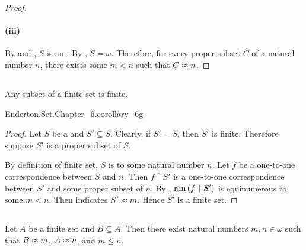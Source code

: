 \documentclass{report}
\begin{document}
\begin{proof}
    \paragraph{(iii)}%

      By  and , $S$ is an
        .
      By , $S = \omega$.
      Therefore, for every proper subset $C$ of a natural number $n$, there
        exists some $m < n$ such that $C \approx n$.

  \end{proof}

\subsection{}%

  \begin{corollary}[6G]
    Any subset of a finite set is finite.
  \end{corollary}

    {Enderton.Set.Chapter\_6.corollary\_6g}

  \begin{proof}
    Let $S$ be a  and $S' \subseteq S$.
    Clearly, if $S' = S$, then $S'$ is finite.
    Therefore suppose $S'$ is a proper subset of $S$.

    By definition of finite set, $S$ is  to some
      natural number $n$.
    Let $f$ be a one-to-one correspondence between $S$ and $n$.
    Then $f \restriction S'$ is a one-to-one correspondence between $S'$ and
      some proper subset of $n$.
    By , $\mathop{\text{ran}}{(f \restriction S')}$ is equinumerous to
      some $m < n$.
    Then  indicates $S' \approx m$.
    Hence $S'$ is a finite set.
  \end{proof}

\subsection{}%

  \begin{lemma}
    Let $A$ be a finite set and $B \subseteq A$.
    Then there exist natural numbers $m, n \in \omega$ such that
      $B \approx m$, $A \approx n$, and $m \leq n$.
  \end{lemma}
\end{document}

